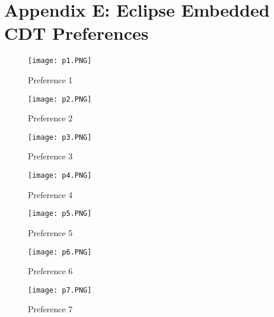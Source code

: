 \chapter*{Appendix E: Eclipse Embedded CDT Preferences}
\label{E}


\begin{figure}[H]
\begin{center}
\texttt{[image: p1.PNG]}
\caption{Preference 1}
\label{fig:p1}
\end{center}
\end{figure}

\begin{figure}[H]
\begin{center}
\texttt{[image: p2.PNG]}
\caption{Preference 2}
\label{fig:p2}
\end{center}
\end{figure}

\begin{figure}[H]
\begin{center}
\texttt{[image: p3.PNG]}
\caption{Preference 3}
\label{fig:p3}
\end{center}
\end{figure}

\begin{figure}[H]
\begin{center}
\texttt{[image: p4.PNG]}
\caption{Preference 4}
\label{fig:p4}
\end{center}
\end{figure}

\begin{figure}[H]
\begin{center}
\texttt{[image: p5.PNG]}
\caption{Preference 5}
\label{fig:p5}
\end{center}
\end{figure}

\begin{figure}[H]
\begin{center}
\texttt{[image: p6.PNG]}
\caption{Preference 6}
\label{fig:p6}
\end{center}
\end{figure}

\begin{figure}[H]
\begin{center}
\texttt{[image: p7.PNG]}
\caption{Preference 7}
\label{fig:p7}
\end{center}
\end{figure}

